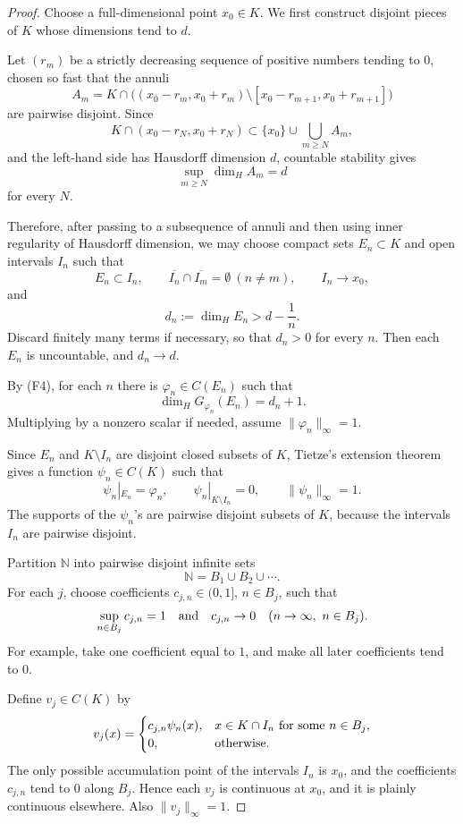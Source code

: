 \documentclass[11pt]{article}
\newcommand{\NN}{\mathbb N}
\newcommand{\dimH}{\dim_{\!H}}
\begin{document}
\begin{proof}
Choose a full-dimensional point \(x_0\in K\).  We first construct disjoint pieces of \(K\) whose dimensions tend to \(d\).

Let \((r_m)\) be a strictly decreasing sequence of positive numbers tending to \(0\), chosen so fast that the annuli
\[
A_m=K\cap\bigl((x_0-r_m,x_0+r_m)\setminus [x_0-r_{m+1},x_0+r_{m+1}]\bigr)
\]
are pairwise disjoint.  Since
\[
K\cap(x_0-r_N,x_0+r_N)
\subset \{x_0\}\cup\bigcup_{m\geq N} A_m,
\]
and the left-hand side has Hausdorff dimension \(d\), countable stability gives
\[
\sup_{m\geq N}\dimH A_m=d
\]
for every \(N\).

Therefore, after passing to a subsequence of annuli and then using inner regularity of Hausdorff dimension, we may choose compact sets \(E_n\subset K\) and open intervals \(I_n\) such that
\[
E_n\subset I_n,\qquad \overline{I_n}\cap\overline{I_m}=\emptyset\ (n\neq m),\qquad I_n\to x_0,
\]
and
\[
d_n:=\dimH E_n>d-\frac1n.
\]
Discard finitely many terms if necessary, so that \(d_n>0\) for every \(n\).  Then each \(E_n\) is uncountable, and \(d_n\to d\).

By (F4), for each \(n\) there is \(\varphi_n\in C(E_n)\) such that
\[
\dimH G_{\varphi_n}(E_n)=d_n+1.
\]
Multiplying by a nonzero scalar if needed, assume \(\|\varphi_n\|_\infty=1\).

Since \(E_n\) and \(K\setminus I_n\) are disjoint closed subsets of \(K\), Tietze's extension theorem gives a function \(\psi_n\in C(K)\) such that
\[
\psi_n|_{E_n}=\varphi_n,\qquad
\psi_n|_{K\setminus I_n}=0,\qquad
\|\psi_n\|_\infty=1.
\]
The supports of the \(\psi_n\)'s are pairwise disjoint subsets of \(K\), because the intervals \(I_n\) are pairwise disjoint.

Partition \(\NN\) into pairwise disjoint infinite sets
\[
\NN=B_1\cup B_2\cup\cdots.
\]
For each \(j\), choose coefficients \(c_{j,n}\in(0,1]\), \(n\in B_j\), such that
\[
\sup_{n\in B_j}c_{j,n}=1
\quad\hbox{and}\quad
c_{j,n}\to0\quad(n\to\infty,\ n\in B_j).
\]
For example, take one coefficient equal to \(1\), and make all later coefficients tend to \(0\).

Define \(v_j\in C(K)\) by
\[
v_j(x)=
\begin{cases}
c_{j,n}\psi_n(x),& x\in K\cap I_n\hbox{ for some }n\in B_j,\\
0,&\hbox{otherwise}.
\end{cases}
\]
The only possible accumulation point of the intervals \(I_n\) is \(x_0\), and the coefficients \(c_{j,n}\) tend to \(0\) along \(B_j\).  Hence each \(v_j\) is continuous at \(x_0\), and it is plainly continuous elsewhere.  Also \(\|v_j\|_\infty=1\).


\end{proof}
\end{document}
